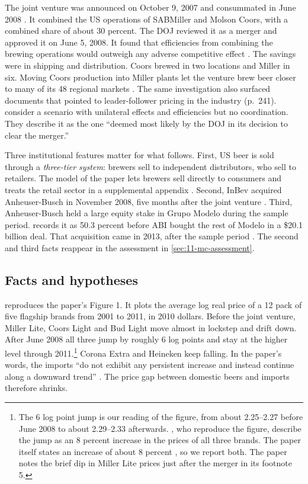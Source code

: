 The joint venture was announced on October 9, 2007 \citep[p.~9]{AshenfelterHoskenWeinberg2015} and consummated in June 2008
\citep[p.~1768]{MillerWeinberg2017}.
It combined the US operations of SABMiller and Molson Coors, with a combined share of about 30 percent. The DOJ
reviewed it as a merger and approved it on June 5, 2008. It found that efficiencies from combining the brewing
operations would outweigh any adverse competitive effect \citep[p.~241, n.~161]{AskerNocke2021}. The savings were in
shipping and distribution. Coors brewed in two locations and Miller in six. Moving Coors production into Miller
plants let the venture brew beer closer to many of its 48 regional markets \citep[pp.~219--220]{AskerNocke2021}. The
same investigation also surfaced documents that pointed to leader-follower pricing in the industry (p.~241).
\citet[p.~1788]{MillerWeinberg2017} consider a scenario with unilateral effects and efficiencies but no
coordination. They describe it as the one ``deemed most likely by the DOJ in its decision to clear the merger.''

Three institutional features matter for what follows. First, US beer is sold through a \emph{three-tier system}:
brewers sell to independent distributors, who sell to retailers. The model of the paper lets brewers sell directly
to consumers and treats the retail sector in a supplemental appendix \citep[p.~1779]{MillerWeinberg2017}. Second,
InBev acquired Anheuser-Busch in November 2008, five months after the joint venture \citep[p.~1784]{MillerWeinberg2017}.
Third, Anheuser-Busch held a large equity stake in Grupo Modelo during the sample period.  records it
as 50.3 percent before ABI bought the rest of Modelo in a \$20.1 billion deal. That acquisition came in 2013, after the
sample period \citep[p.~1767]{MillerWeinberg2017}. The second and third facts reappear in the assessment in
\cref{sec:11-mc-assessment}.

\subsection{Facts and hypotheses}\label{sec:11-mc-facts}

 reproduces the paper's Figure 1. It plots the average log real price of a 12 pack of five
flagship brands from 2001 to 2011, in 2010 dollars. Before the joint venture, Miller Lite, Coors Light and Bud Light
move almost in lockstep and drift down. After June 2008 all three jump by roughly 6 log points and stay at the higher
level through 2011.\footnote{The 6 log point jump is our reading of the figure, from about 2.25--2.27 before June
2008 to about 2.29--2.33 afterwards. \citet[p.~242]{AskerNocke2021}, who reproduce the figure, describe the jump as
an 8 percent increase in the prices of all three brands. The paper itself states an increase of about 8 percent
\citep[p.~1768]{MillerWeinberg2017}, so we report both. The paper notes the brief dip in Miller Lite prices just
after the merger in its footnote 5.} Corona Extra and Heineken keep falling. In the paper's words, the imports ``do not exhibit any
persistent increase and instead continue along a downward trend'' \citep[p.~1769]{MillerWeinberg2017}. The price
gap between domestic beers and imports therefore shrinks.

